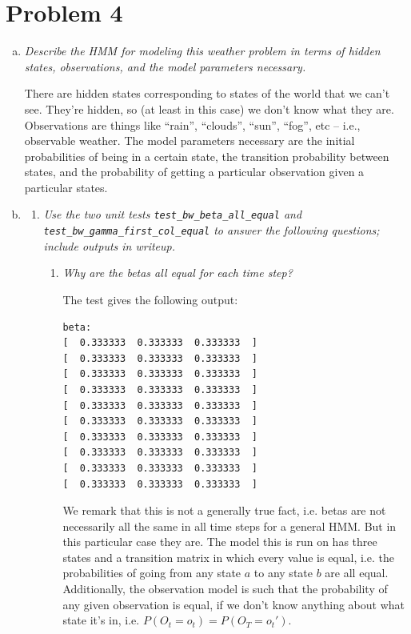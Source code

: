 \documentclass{article}
\begin{document}
\section*{Problem 4}
\begin{enumerate}[(a)]
\item \emph{Describe the HMM for modeling this weather problem in terms of hidden
  states, observations, and the model parameters necessary.}

  There are hidden states corresponding to states of the world that we can't
  see. They're hidden, so (at least in this case) we don't know what they are. 
  Observations are things like ``rain'', ``clouds'', ``sun'', ``fog'', etc -- 
  i.e., observable weather. 
  The model parameters necessary are the initial probabilities of being in a
  certain state, the transition probability between states, and the probability
  of getting a particular observation given a particular states. 

\item
  \begin{enumerate}
    \setcounter{enumii}2
  \item \emph{Use the two unit tests \emph{\texttt{test\_bw\_beta\_all\_equal}}
    and
    \emph{\texttt{test\_bw\_gamma\_first\_col\_equal}} to answer the following questions;
    include outputs in writeup.}

    \begin{enumerate}[(1)]
    \item \emph{Why are the betas all equal for each time step?} 

    The test gives the following output:
\begin{verbatim}
beta:
[  0.333333  0.333333  0.333333  ]
[  0.333333  0.333333  0.333333  ]
[  0.333333  0.333333  0.333333  ]
[  0.333333  0.333333  0.333333  ]
[  0.333333  0.333333  0.333333  ]
[  0.333333  0.333333  0.333333  ]
[  0.333333  0.333333  0.333333  ]
[  0.333333  0.333333  0.333333  ]
[  0.333333  0.333333  0.333333  ]
[  0.333333  0.333333  0.333333  ]
\end{verbatim}

    We remark that this is not a generally true fact, i.e. betas are not 
    necessarily all the same in all time steps for a general HMM. 
    But in this particular case they are. The model this is run on has three states
    and a transition matrix in which every value is equal, i.e. the probabilities
    of going from any state $a$ to any state $b$ are all equal. 
    Additionally, the observation model is such that the probability of any
    given observation is equal, if we don't know anything about what 
    state it's in, i.e. $P(O_t=o_t)=P(O_T=o_t')$. 


\end{enumerate}
\end{enumerate}
\end{enumerate}
\end{document}
